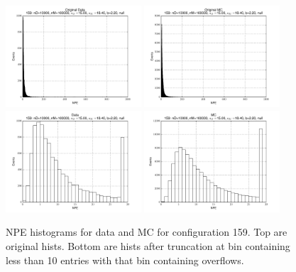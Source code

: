  \begin{figure}[htbp] \begin{center} 
\includegraphics[width=0.45\textwidth]{../FIGURES/159/FIG_Original_Data.pdf} 
\includegraphics[width=0.45\textwidth]{../FIGURES/159/FIG_Original_MC.pdf} 
\includegraphics[width=0.45\textwidth]{../FIGURES/159/FIG_Data.pdf} 
\includegraphics[width=0.45\textwidth]{../FIGURES/159/FIG_MC.pdf} 
\caption{NPE histograms for data and MC for configuration 159. Top are original hists. Bottom are hists after truncation at bin containing less than 10 entries with that bin containing overflows.} 
\label{tab:npe_159} 
\end{center} \end{figure} 
\clearpage
 